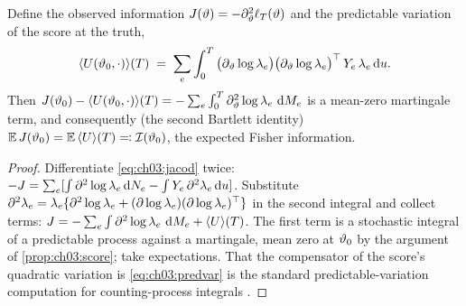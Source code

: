 \begin{proposition}\label{prop:ch03:information}
Define the observed information
$J(\vartheta) = -\partial^2_{\vartheta}\ell_{T}(\vartheta)$
and the predictable variation of the score at the truth,
\begin{equation}\label{eq:ch03:predvar}
\langle U(\vartheta_0,\cdot)\rangle(T)
 \;=\;
 \sum_{e}\int_0^{T}
 \big(\partial_{\vartheta}\log\lambda_e\big)
 \big(\partial_{\vartheta}\log\lambda_e\big)^{\top}
 \,Y_e\,\lambda_e \,\mathrm{d} u .
\end{equation}
Then $J(\vartheta_0) - \langle
U(\vartheta_0,\cdot)\rangle(T) = -\sum_e \int_0^{T}
\partial^2_{\vartheta}\log\lambda_e \,\,\mathrm{d} M_e$ is a mean-zero martingale
term, and consequently (the second Bartlett identity)
$\mathbb{E}\,J(\vartheta_0) = \mathbb{E}\,\langle U\rangle(T)
 \eqqcolon \mathcal{I}(\vartheta_0)$,
the expected Fisher information.
\end{proposition}

\begin{proof}
Differentiate \cref{eq:ch03:jacod} twice:
$-J = \sum_e[\int \partial^2\log\lambda_e \,\mathrm{d} N_e - \int
Y_e\,\partial^2\lambda_e \,\mathrm{d} u]$. Substitute
$\partial^2\lambda_e = \lambda_e\{\partial^2\log\lambda_e +
(\partial\log\lambda_e)(\partial\log\lambda_e)^{\top}\}$ in the second integral and
collect terms:
$J = -\sum_e\int \partial^2\log\lambda_e\,\,\mathrm{d} M_e +
\langle U\rangle(T)$. The first term is a stochastic integral of
a predictable process against a martingale, mean zero at
$\vartheta_0$ by the argument of \cref{prop:ch03:score}; take
expectations. That the compensator of the score's quadratic variation is
\cref{eq:ch03:predvar} is the standard predictable-variation computation
for counting-process integrals \citep[Ch.~II]{abgk1993}.
\end{proof}

